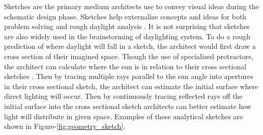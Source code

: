 
Sketches are the primary medium architects use to convey visual ideas during the schematic design phase.
Sketches help externalize concepts and ideas for both problem solving and rough daylight analysis \cite{Suwa,yancy}.
It is not surprising that sketches are also widely used in the brainstorming of daylighting system.
To do a rough prediction of where daylight will fall in a sketch, the architect would first draw a cross section of their imagined space.
Though the use of specialized protractors, the architect can calculate where the sun is in relation to their cross sectional sketches \cite{james1976sun}.
Then by tracing multiple rays parallel to the sun angle into apertures in their cross sectional sketch, the architect can estimate the initial surface where direct lighting will occur.
Then by continuously tracing reflected rays off the initial surface into the cross sectional sketch architects can better estimate how light will distribute in given space.
Examples of these analytical sketches are shown in Figure-\ref{fig:geometry_sketch}. \\

